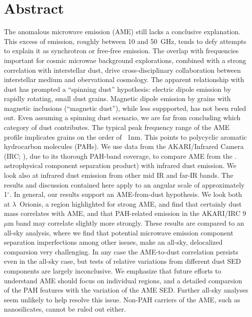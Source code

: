 \chapter*{Abstract}
The anomalous microwave emission (AME) still lacks a conclusive explanation.  This excess of emission, roughly between 10 and 50~GHz, tends to defy attempts to explain it as synchrotron or free-free emission. The overlap with frequencies important for cosmic microwae background explorations, combined with a strong correlation with interstellar dust, drive cross-disciplinary collaboration between interstellar medium and obervational cosmology. The apparent relationship with dust has prompted a ``spinning dust'' hypothesis:  electric dipole emission by rapidly rotating, small dust grains. Magnetic dipole emission by grains with magnetic inclusions (``magnetic dust''), while less suppported, has not been ruled out. Even assuming a spinning dust scenario, we are far from concluding which category of dust contributes. The typical peak frequency range of the AME profile implicates grains on the order of ~1nm. This points to polycyclic aromatic hydrocarbon molecules (PAHs). We use data from the AKARI/Infrared Camera (IRC; \citet{irc07}), due to its thorough PAH-band coverage, to compare AME from the \cite{planck15X}. astrophysical component separation product) with infrared dust emission. We look also at infrared dust emission from other mid IR and far-IR bands. The results and discussion contained here apply to an angular scale of approximately 1$^{\circ}$. In general, our results support an AME-from-dust hypothesis. We look both at $\lambda$~Orionis, a region highlighted for strong AME, and find that certainly dust mass correlates with AME, and that PAH-related emission in the AKARI/IRC 9~$\mu$m band may correlate slightly more strongly. These results are compared to an all-sky analysis, where we find that potential microwave emission component separation imperfections among other issues, make an all-sky, delocalized comparsion very challenging. In any case the AME-to-dust correlation persists even in the all-sky case, but tests of relative variations from different dust SED components are largely inconclusive. We emphasize that future efforts to understand AME should focus on individual regions, and a detailed comparsion of the PAH features with the variation of the AME SED. Further all-sky analyses seem unlikely to help resolve this issue. Non-PAH carriers of the AME, such as nanosilicates, cannot be ruled out either.
